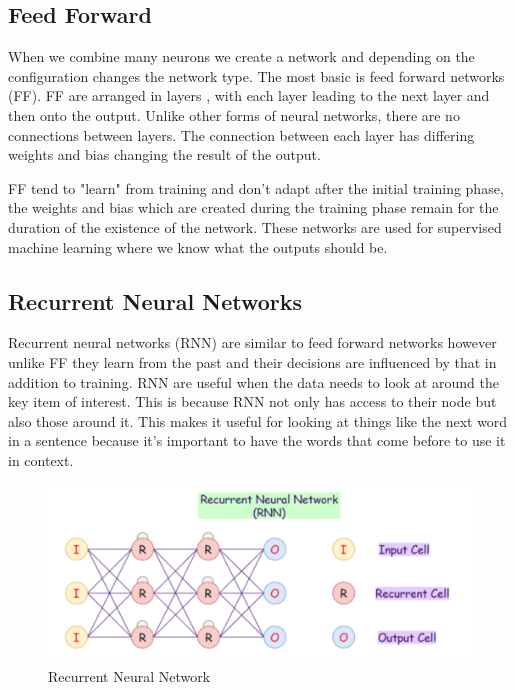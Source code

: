 \documentclass[11pt]{article}
\begin{document}
    \subsection{Feed Forward}
    When we combine many neurons we create a network and depending on the configuration changes the network type. The most basic is feed forward networks (FF). FF are arranged in layers \cite{NeuralArchitecture}, with each layer leading to the next layer and then onto the output. Unlike other forms of neural networks, there are no connections between layers. The connection between each layer has differing weights and bias changing the result of the output.
    
    FF tend to "learn" from training and don't adapt after the initial training phase, the weights and bias which are created during the training phase remain for the duration of the existence of the network. These networks are used for supervised machine learning where we know what the outputs should be. 
    
    \subsection{Recurrent Neural Networks}
    Recurrent neural networks (RNN) are similar to feed forward networks however unlike FF they learn from the past \cite{RecurrentScience} and their decisions are influenced by that in addition to training. RNN are useful when the data needs to look at around the key item of interest. This is because RNN not only has access to their node but also those around it. This makes it useful for looking at things like the next word in a sentence because it's important to have the words that come before to use it in context.
    
        \begin{figure}[h]
        \centering
        \includegraphics[scale=0.75]{RNN.png}
        \caption{Recurrent Neural Network \cite{MainAI}}
        \label{fig:RRN}
    \end{figure}
    
\end{document}
